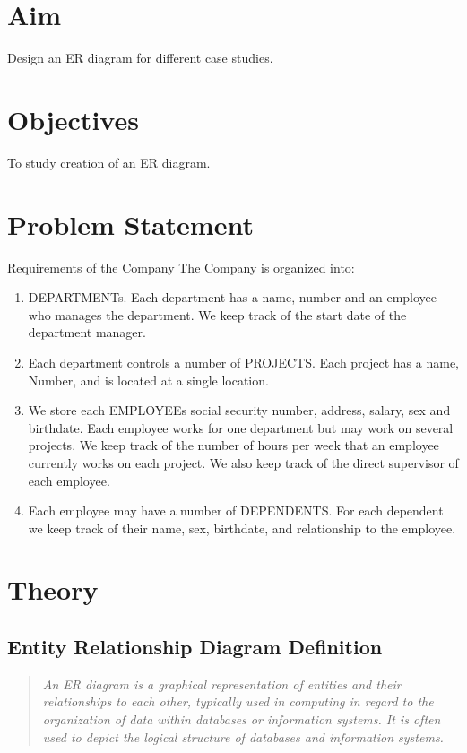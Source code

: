 \documentclass[11pt]{article}
\begin{document}
\tableofcontents
\thispagestyle{empty}
\clearpage

\setcounter{page}{1}

\section{Aim}
Design an ER diagram for different case studies.

\section{Objectives}
To study creation of an ER diagram.

\section{Problem Statement}
Requirements of the Company
The Company is organized into:
\begin{enumerate}
	\item DEPARTMENTs. Each department has a name, number and an employee who manages the department. We keep track of the start date of the department manager.
	\item Each department controls a number of PROJECTS. Each project has a name, Number, and is located at a single location.
	\item We store each EMPLOYEEs social security number, address, salary, sex and birthdate. Each employee works for one department but may work on several projects. We keep track of the number of hours per week that an employee currently works on each project. We also keep track of the direct supervisor of each employee.
	\item Each employee may have a number of DEPENDENTS. For each dependent we keep track of their name, sex, birthdate, and relationship to the employee.
\end{enumerate}

\section{Theory}

\subsection{Entity Relationship Diagram Definition}
\begin{quote}
	\textit{	An ER diagram is a graphical representation of entities and their relationships to each other, typically used in computing in regard to the organization of data within databases or information systems. It is often used to depict the logical structure of databases and information systems.}
\end{quote}
\end{document}
